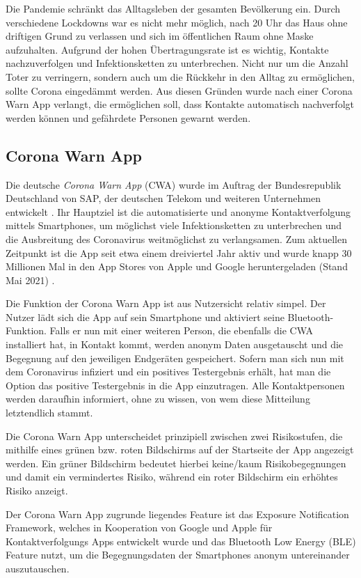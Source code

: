 \documentclass[conference,compsoc]{IEEEtran}
\begin{document}
Die Pandemie schränkt das Alltagsleben der gesamten Bevölkerung ein. 
Durch verschiedene Lockdowns war es nicht mehr möglich, nach 20 Uhr das Haus ohne driftigen Grund zu verlassen und sich im öffentlichen Raum ohne Maske aufzuhalten. 
Aufgrund der hohen Übertragungsrate ist es wichtig, Kontakte nachzuverfolgen und Infektionsketten zu unterbrechen.
Nicht nur um die Anzahl Toter zu verringern, sondern auch um die Rückkehr in den Alltag zu ermöglichen, sollte Corona eingedämmt werden.
Aus diesen Gründen wurde nach einer Corona Warn App verlangt, die ermöglichen soll, dass Kontakte automatisch nachverfolgt werden können und gefährdete Personen gewarnt werden.

\subsection{Corona Warn App}
Die deutsche \textit{Corona Warn App} (CWA) wurde im Auftrag der Bundesrepublik Deutschland von SAP, der deutschen Telekom und weiteren Unternehmen entwickelt \cite{CWA}. 
Ihr Hauptziel ist die automatisierte und anonyme Kontaktverfolgung mittels Smartphones, um möglichst viele Infektionsketten zu unterbrechen und die Ausbreitung des Coronavirus weitmöglichst zu verlangsamen. 
Zum aktuellen Zeitpunkt ist die App seit etwa einem dreiviertel Jahr aktiv und wurde knapp 30 Millionen Mal in den App Stores von Apple und Google heruntergeladen (Stand Mai 2021) \cite{Downloads}.

Die Funktion der Corona Warn App ist aus Nutzersicht relativ simpel. Der Nutzer lädt sich die App auf sein Smartphone und aktiviert seine Bluetooth-Funktion. 
Falls er nun mit einer weiteren Person, die ebenfalls die CWA installiert hat, in Kontakt kommt, werden anonym Daten ausgetauscht und die Begegnung auf den jeweiligen Endgeräten gespeichert. 
Sofern man sich nun mit dem Coronavirus infiziert und ein positives Testergebnis erhält, hat man die Option das positive Testergebnis in die App einzutragen. 
Alle Kontaktpersonen werden daraufhin informiert, ohne zu wissen, von wem diese Mitteilung letztendlich stammt. 

Die Corona Warn App unterscheidet prinzipiell zwischen zwei Risikostufen, die mithilfe eines grünen bzw. roten Bildschirms auf der Startseite der App angezeigt werden. 
Ein grüner Bildschirm bedeutet hierbei keine/kaum Risikobegegnungen und damit ein vermindertes Risiko, während ein roter Bildschirm ein erhöhtes Risiko anzeigt.

Der Corona Warn App zugrunde liegendes Feature ist das \glqq Exposure Notification Framework\grqq, 
welches in Kooperation von Google und Apple für Kontaktverfolgungs Apps entwickelt wurde und das Bluetooth Low Energy (BLE) Feature nutzt, 
um die Begegnungsdaten der Smartphones anonym untereinander auszutauschen. \\
\end{document}
